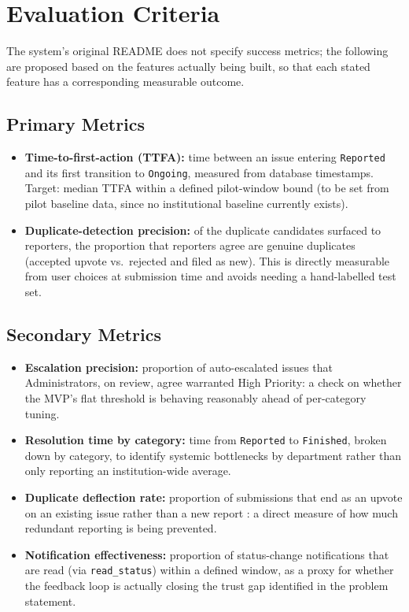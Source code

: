 \documentclass[11pt,a4paper]{article}
\begin{document}
\section{Evaluation Criteria}

The system's original README does not specify success metrics; the
following are proposed based on the features actually being built, so
that each stated feature has a corresponding measurable outcome.

\subsection{Primary Metrics}
\label{sec:eval-primary}
\begin{itemize}[leftmargin=0.7cm]
  \item \textbf{Time-to-first-action (TTFA):} time between an issue
    entering \texttt{Reported} and its first transition to
    \texttt{Ongoing}, measured from database timestamps. Target: median
    TTFA within a defined pilot-window bound (to be set from pilot
    baseline data, since no institutional baseline currently exists).
  \item \textbf{Duplicate-detection precision:} of the duplicate
    candidates surfaced to reporters, the proportion that reporters
    agree are genuine duplicates (accepted upvote vs.\ rejected and
    filed as new). This is directly measurable from user choices at
    submission time and avoids needing a hand-labelled test set.
\end{itemize}

\subsection{Secondary Metrics}
\begin{itemize}[leftmargin=0.7cm]
  \item \textbf{Escalation precision:} proportion of auto-escalated
    issues that Administrators, on review, agree warranted High
    Priority: a check on whether the MVP's flat threshold is behaving
    reasonably ahead of per-category tuning.
  \item \textbf{Resolution time by category:} time from
    \texttt{Reported} to \texttt{Finished}, broken down by category, to
    identify systemic bottlenecks by department rather than only
    reporting an institution-wide average.
  \item \textbf{Duplicate deflection rate:} proportion of submissions
    that end as an upvote on an existing issue rather than a new report
    : a direct measure of how much redundant reporting is being
    prevented.
  \item \textbf{Notification effectiveness:} proportion of
    status-change notifications that are read (via
    \texttt{read\_status}) within a defined window, as a proxy for
    whether the feedback loop is actually closing the trust gap
    identified in the problem statement.
\end{itemize}
\end{document}
